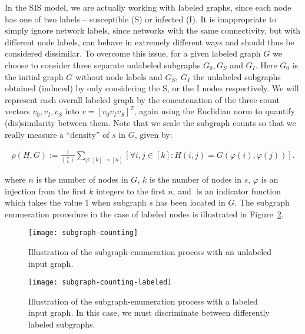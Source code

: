 In the SIS model, we are actually working with labeled graphs, since
each node has one of two labels – susceptible (S) or infected (I). It
is inappropriate to simply ignore network labels, since networks with
the same connectivity, but with different node labels, can behave in
extremely different ways and should thus be considered dissimilar. To
overcome this issue, for a given labeled graph $G$ we choose to
consider three separate unlabeled subgraphs $G_0, G_S$ and $G_I$. Here
$G_0$ is the initial graph $G$ without node labels and $G_S$, $G_I$
the unlabeled subgraphs obtained (induced) by only considering the S,
or the I nodes respectively. We will represent each overall labeled
graph by the concatenation of the three count vectors $v_0, v_I, v_S$
into $v = [v_0 v_I v_S]^T$, again using the Euclidian norm to quantify (dis)similarity
between them. Note that we scale the subgraph counts so that we really
measure a “density” of $s$ in $G$, given by:

\begin{align}
  \label{eqn:homdenG}
  \rho(H,G) := \frac{1}{{n\choose k}} \!  \sum_{\varphi:[k] \to [n]} \!
  \left[ \forall  i, j \in [k] \! : \! H(i,j) \! = \! G(\varphi(i),
  \varphi(j)) \right].
\end{align}

where $n$ is the number of nodes in $G$, $k$ is the number of nodes in
$s$, $\varphi$ is an injection from the first $k$ integers to the
first $n$, and $\!$ is an indicator function which takes the value 1
when subgraph $s$ has been located in $G$. The subgraph enumeration
procedure in the case of labeled nodes is illustrated in Figure~\ref{fig:sis5}.

\begin{figure}[!htp]
\centering
\texttt{[image: subgraph-counting]}
\caption[Illustration of subgraph-enumeration process for unlabeled graphs]{Illustration of the subgraph-enumeration process with an
  unlabeled input graph. \label{fig:sis4}}
\end{figure}

\begin{figure}[!htp]
\centering
\texttt{[image: subgraph-counting-labeled]}
\caption[Illustration of subgraph-enumeration process for labeled graphs]{Illustration of the subgraph-enumeration process with a
  labeled input graph. In this case, we must discriminate between
  differently labeled subgraphs. \label{fig:sis5}}
\end{figure}

